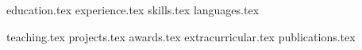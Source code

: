 \documentclass[letterpaper,11pt]{article}
\begin{document}


{education.tex}
{experience.tex}
\sidebyside
    {{skills.tex}}
    {{languages.tex}}


{teaching.tex}
{projects.tex}
{awards.tex}
{extracurricular.tex}
{publications.tex}
\end{document}
